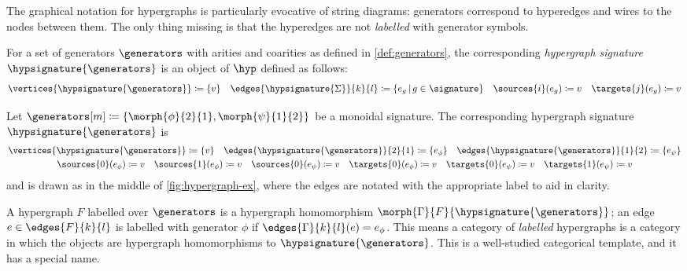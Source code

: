 The graphical notation for hypergraphs is particularly evocative of string
diagrams: generators
correspond to hyperedges and wires to the nodes between them.
The only thing missing is that the hyperedges are not \emph{labelled} with
generator symbols.

\begin{definition}
    For a set of generators \(\generators\) with arities and coarities as defined
    in \cref{def:generators}, the corresponding \emph{hypergraph signature}
    \(\hypsignature{\generators}\) is an object of \(\hyp\) defined as follows:
    \begin{gather*}
        \vertices{\hypsignature{\generators}}
        \coloneqq
        \{ v \}
        \quad
        \edges{\hypsignature{\Sigma}}{k}{l}
        \coloneqq
        \{ e_g \,|\, g \in \signature\}
        \quad
        \sources{i}(e_g) \coloneqq v
        \quad
        \targets{j}(e_g) \coloneqq v
    \end{gather*}
\end{definition}

\begin{example}\label{ex:labelled-hypergraph-signature}
    Let \(\generators[m] \coloneqq \{\morph{\phi}{2}{1}, \morph{\psi}{1}{2}\}\)
    be a monoidal signature.
    The corresponding hypergraph signature \(\hypsignature{\generators}\) is
    \begin{gather*}
        \vertices{\hypsignature{\generators}} \coloneqq \{v\}
        \quad
        \edges{\hypsignature{\generators}}{2}{1} \coloneqq \{e_\phi\}
        \quad
        \edges{\hypsignature{\generators}}{1}{2} \coloneqq \{e_\psi\}
        \\
        \sources{0}(e_\phi) \coloneqq v
        \quad
        \sources{1}(e_\phi) \coloneqq v
        \quad
        \sources{0}(e_\psi) \coloneqq v
        \quad
        \targets{0}(e_\phi) \coloneqq v
        \quad
        \targets{0}(e_\psi) \coloneqq v
        \quad
        \targets{1}(e_\psi) \coloneqq v
    \end{gather*}
    and is drawn as in the middle of \cref{fig:hypergraph-ex}, where the edges
    are notated with the appropriate label to aid in clarity.
\end{example}

A hypergraph \(F\) labelled over \(\generators\) is a hypergraph homomorphism
\(\morph{\Gamma}{F}{\hypsignature{\generators}}\);
an edge \(e \in \edges{F}{k}{l}\) is labelled with generator
\(\phi\) if \(\edges{\Gamma}{k}{l}(e) = e_\phi\).
This means a category of \emph{labelled} hypergraphs is a category in which the
objects are hypergraph homomorphisms to \(\hypsignature{\generators}\).
This is a well-studied categorical template, and it has a special name.

